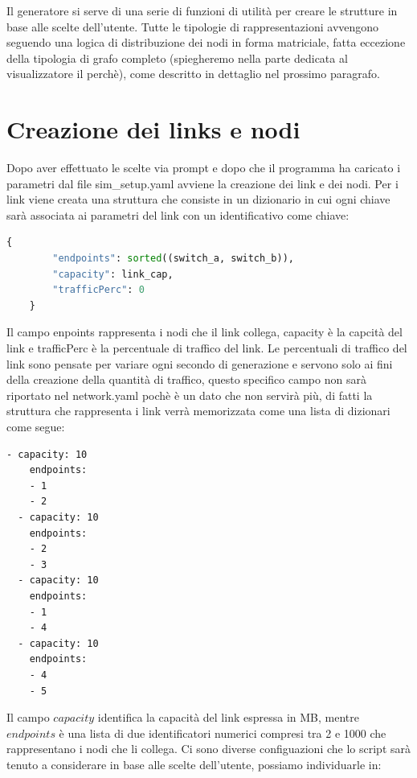 \documentclass[binding=0.6cm]{sapthesis}
\begin{document}
Il generatore si serve di una serie di funzioni di utilità per creare le strutture in base alle scelte dell'utente. 
Tutte le tipologie di rappresentazioni avvengono seguendo una logica di distribuzione dei nodi in forma matriciale, fatta eccezione della tipologia di
grafo completo (spiegheremo nella parte dedicata al visualizzatore il perchè), come descritto in dettaglio nel prossimo paragrafo.


\section{Creazione dei links e nodi}
Dopo aver effettuato le scelte via prompt e dopo che il programma ha caricato i parametri dal file sim\_setup.yaml 
avviene la creazione dei link e dei nodi. Per i link viene creata una struttura che consiste in un dizionario in cui ogni chiave sarà associata
ai parametri del link con un identificativo come chiave:

{\scriptsize %
\begin{lstlisting}[language=Python, caption={esempio di rappresentazione di un link}, label={codice:links_key_value}]
    {
        "endpoints": sorted((switch_a, switch_b)),
        "capacity": link_cap,
        "trafficPerc": 0
    }
\end{lstlisting}
}
Il campo enpoints rappresenta i nodi che il link collega, capacity è la capcità del link e trafficPerc è la percentuale di traffico del link.
Le percentuali di traffico del link sono pensate per variare ogni secondo di generazione e servono solo ai fini della creazione della quantità di traffico, questo specifico campo non sarà riportato nel network.yaml
pochè è un dato che non servirà più, di fatti la struttura che rappresenta i link verrà memorizzata come una lista di dizionari come segue:


{\scriptsize %
\begin{lstlisting}[caption={esempio di struttura finale dei links}, label={codice:links_structure}]
  - capacity: 10
    endpoints:
    - 1
    - 2
  - capacity: 10
    endpoints:
    - 2
    - 3
  - capacity: 10
    endpoints:
    - 1
    - 4
  - capacity: 10
    endpoints:
    - 4
    - 5
\end{lstlisting}
}

Il campo \(capacity\) identifica la capacità del link espressa in MB, mentre \(endpoints\) è una lista di due identificatori numerici compresi tra
2 e 1000 che rappresentano i nodi che li collega.
Ci sono diverse configuazioni che lo script sarà tenuto a considerare in base alle scelte dell'utente, possiamo individuarle in:
\end{document}
